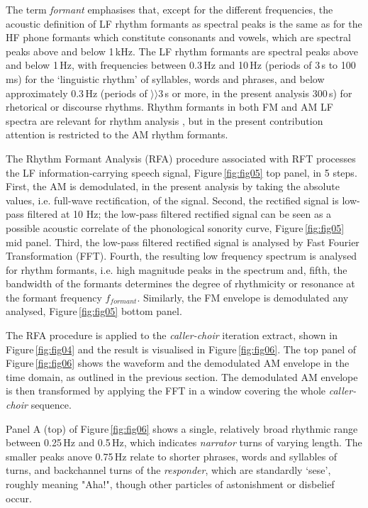 \documentclass[output=paper,colorlinks,citecolor=brown
]{langscibook}
\begin{document}
The term \textit{formant} emphasises that, except for the different frequencies, the acoustic definition of LF rhythm formants as spectral peaks is the same as for the HF phone formants which constitute consonants and vowels, which are spectral peaks above and below 1\,kHz. The LF rhythm formants are spectral peaks above and below 1\,Hz, with frequencies between 0.3\,Hz and 10\,Hz (periods of 3\,s to 100\,ms) for the `linguistic rhythm' \cite{libermanprince1977} of syllables, words and phrases, and below approximately 0.3\,Hz (periods of $\rangle\rangle$3\,s or more, in the present analysis 300\,s) for rhetorical or discourse rhythms. Rhythm formants in both FM and AM LF spectra are relevant for rhythm analysis \cite{gibbonsp2018, gibbonjipa2021, gibbonsp2022, gibbon4urua2022}, but in the present contribution attention is restricted to the AM rhythm formants.

The Rhythm Formant Analysis (RFA) procedure associated with RFT processes the LF information-carrying speech signal, Figure\,\ref{fig:fig05} top panel, in 5 steps. First, the AM is demodulated, in the present analysis by taking the absolute values, i.e. full-wave rectification, of the signal. Second, the rectified signal is low-pass filtered at 10 Hz; the low-pass filtered rectified signal can be seen as a possible acoustic correlate of the phonological sonority curve, Figure\,\ref{fig:fig05} mid panel. Third, the low-pass filtered rectified signal is analysed by Fast Fourier Transformation (FFT). Fourth, the resulting low frequency spectrum is analysed for rhythm formants, i.e. high magnitude peaks in the spectrum and, fifth, the bandwidth of the formants determines the degree of rhythmicity or resonance at the formant frequency $f_{formant}$. Similarly, the FM envelope is demodulated any analysed, Figure\,\ref{fig:fig05} bottom panel.

The RFA procedure is applied to the \textit{caller-choir} iteration extract, shown in Figure\,\ref{fig:fig04} and the result is visualised in Figure\,\ref{fig:fig06}. The top panel of Figure\,\ref{fig:fig06} shows the waveform and the demodulated AM envelope in the time domain, as outlined in the previous section. The demodulated AM envelope is then transformed by applying the FFT in a window covering the whole \textit{caller-choir} sequence.

Panel A (top) of Figure\,\ref{fig:fig06} shows a single, relatively broad rhythmic range between 0.25\,Hz and 0.5\,Hz, which indicates \textit{narrator} turns of varying length. The smaller peaks anove 0.75\,Hz relate to shorter phrases, words and syllables of turns, and backchannel turns of the \textit{responder}, which are standardly `sese', roughly meaning "Aha!", though other particles of astonishment or disbelief occur.
\end{document}
